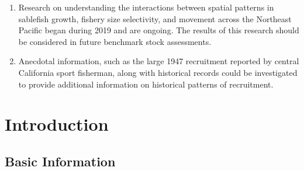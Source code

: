 \documentclass[11pt,
  english,
  a4paper,
]{article}
\begin{document}
\begin{enumerate}
  \leavevmode\tagmcend\tagstructend\par
\item

  Research on understanding the interactions between spatial patterns in sablefish growth, fishery size selectivity, and movement across the Northeast Pacific began during 2019 and are ongoing. The results of this research should be considered in future benchmark stock assessments.

  \leavevmode\tagmcend\tagstructend\par
\item

  Anecdotal information, such as the large 1947 recruitment reported by central California sport fisherman, along with historical records could be investigated to provide additional information on historical patterns of recruitment.

  \leavevmode\tagmcend\tagstructend\par
\end{enumerate}

\tagstructend

\pagebreak
\setlength{\parskip}{5mm plus1mm minus1mm}
\setcounter{page}{1}
\renewcommand{\thefigure}{\arabic{figure}}
\renewcommand{\thetable}{\arabic{table}}
\setcounter{table}{0}
\setcounter{figure}{0}


\hypertarget{introduction}{%
\section{Introduction}\label{introduction}}

\leavevmode\tagmcend\tagstructend


\hypertarget{basic-information}{%
\subsection{Basic Information}\label{basic-information}}

\leavevmode\tagmcend\tagstructend

\end{document}
